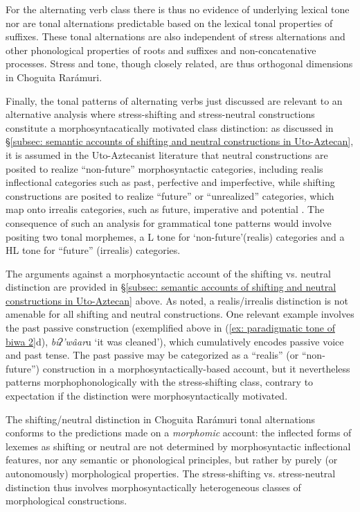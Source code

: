 For the alternating verb class there is thus no evidence of underlying lexical tone nor are tonal alternations predictable based on the lexical tonal properties of suffixes. These tonal alternations are also independent of stress alternations and other phonological properties of roots and suffixes and non-concatenative processes. Stress and tone, though closely related, are thus orthogonal dimensions in Choguita Rarámuri.

Finally, the tonal patterns of alternating verbs just discussed are relevant to an alternative analysis where stress-shifting and stress-neutral constructions constitute a morphosyntacatically motivated class distinction: as discussed in §\ref{subsec: semantic accounts of shifting and neutral constructions in Uto-Aztecan}, it is assumed in the  Uto-Aztecanist literature that neutral constructions are posited to realize ``non-future'' morphosyntactic categories, including realis inflectional categories such as past, perfective and imperfective, while shifting constructions are posited to realize ``future'' or ``unrealized'' categories, which map onto irrealis categories, such as future, imperative and potential \citep[][133]{langacker1977uto}. The consequence of such an analysis for grammatical tone patterns would involve positing two tonal morphemes, a L tone for ‘non-future’(realis) categories and a HL tone for ``future'' (irrealis) categories.

The arguments against a morphosyntactic account of the shifting vs. neutral distinction are provided in §\ref{subsec: semantic accounts of shifting and neutral constructions in Uto-Aztecan} above. As noted, a realis/irrealis distinction is not amenable for all shifting and neutral constructions. One relevant example involves the past passive construction (exemplified above in (\ref{ex: paradigmatic tone of biwa 2}d), \textit{biʔ'wâar}u ‘it was cleaned’), which cumulatively encodes passive voice and past tense. The past passive may be categorized as a ``realis'' (or ``non-future'') construction in a morphosyntactically-based account, but it nevertheless patterns morphophonologically with the stress-shifting class, contrary to expectation if the distinction were morphosyntactically motivated.

The shifting/neutral distinction in Choguita Rarámuri tonal alternations conforms to the predictions made on a \textit{morphomic} account: the inflected forms of lexemes as shifting or neutral are not determined by morphosyntactic inflectional features, nor any semantic or phonological principles, but rather by purely (or autonomously) morphological properties. The stress-shifting vs. stress-neutral distinction thus involves morphosyntactically heterogeneous classes of morphological constructions.

